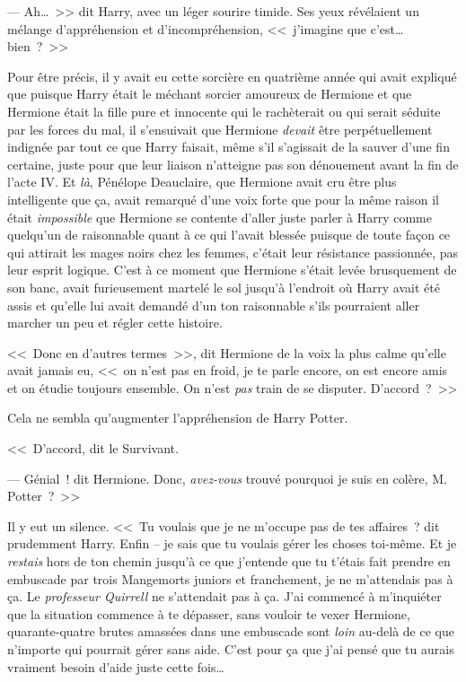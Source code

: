 --- Ah…~>> dit Harry, avec un léger sourire timide. Ses yeux révélaient un mélange d'appréhension et d'incompréhension, <<~j'imagine que c'est… bien~?~>>

Pour être précis, il y avait eu cette sorcière en quatrième année qui avait expliqué que puisque Harry était le méchant sorcier amoureux de Hermione et que Hermione était la fille pure et innocente qui le rachèterait ou qui serait séduite par les forces du mal, il s'ensuivait que Hermione \emph{devait} être perpétuellement indignée par tout ce que Harry faisait, même s'il s'agissait de la sauver d'une fin certaine, juste pour que leur liaison n'atteigne pas son dénouement avant la fin de l'acte IV. Et \emph{là}, Pénélope Deauclaire, que Hermione avait cru être plus intelligente que ça, avait remarqué d'une voix forte que pour la même raison il était \emph{impossible} que Hermione se contente d'aller juste parler à Harry comme quelqu'un de raisonnable quant à ce qui l'avait blessée puisque de toute façon ce qui attirait les mages noirs chez les femmes, c'était leur résistance passionnée, pas leur esprit logique. C'est à ce moment que Hermione s'était levée brusquement de son banc, avait furieusement martelé le sol jusqu'à l'endroit où Harry avait été assis et qu'elle lui avait demandé d'un ton raisonnable s'ils pourraient aller marcher un peu et régler cette histoire.

<<~Donc en d'autres termes~>>, dit Hermione de la voix la plus calme qu'elle avait jamais eu, <<~on n'est pas en froid, je te parle encore, on est encore amis et on étudie toujours ensemble. On n'est \emph{pas} train de se disputer. D'accord~?~>>

Cela ne sembla qu'augmenter l'appréhension de Harry Potter.

<<~D'accord, dit le Survivant.

--- Génial~! dit Hermione. Donc, \emph{avez-vous} trouvé pourquoi je suis en colère, M. Potter~?~>>

Il y eut un silence. <<~Tu voulais que je ne m'occupe pas de tes affaires~? dit prudemment Harry. Enfin -- je sais que tu voulais gérer les choses toi-même. Et je \emph{restais} hors de ton chemin jusqu'à ce que j'entende que tu t'étais fait prendre en embuscade par trois Mangemorts juniors et franchement, je ne m'attendais pas à ça. Le \emph{professeur Quirrell} ne s'attendait pas à ça. J'ai commencé à m'inquiéter que la situation commence à te dépasser, sans vouloir te vexer Hermione, quarante-quatre brutes amassées dans une embuscade sont \emph{loin} au-delà de ce que n'importe qui pourrait gérer sans aide. C'est pour ça que j'ai pensé que tu aurais vraiment besoin d'aide juste cette fois…

